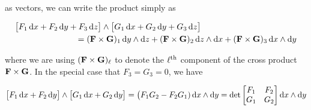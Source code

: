 \begin{eg}
as vectors, we can write the product simply as 
\begin{impeqn}\label{eqn:prodCross}
\begin{align*}
&\big[F_1\,\mathrm{d}x
     + F_2\,\mathrm{d}y
     + F_3\,\mathrm{d}z\big]
   \wedge
   \big[G_1\,\mathrm{d}x
     + G_2\,\mathrm{d}y
     + G_3\,\mathrm{d}z\big]
\\
&\hskip1in=(\mathbf{F}\times\mathbf{G})_1\, \mathrm{d}y\wedge\mathrm{d}z
 +(\mathbf{F}\times\mathbf{G})_2\, \mathrm{d}z\wedge\mathrm{d}x
 +(\mathbf{F}\times\mathbf{G})_3\, \mathrm{d}x\wedge\mathrm{d}y
\end{align*}
\end{impeqn}
\noindent
where we are using $(\mathbf{F}\times\mathbf{G})_\ell$ to denote the $\ell^{\rm th}$
component of the cross product $\mathbf{F}\times\mathbf{G}$.
In the special case that $F_3=G_3=0$, we have
\begin{impeqn}\label{eqnprodDet}
\begin{align*}
\big[F_1\,\mathrm{d}x
     + F_2\,\mathrm{d}y\big]
   \wedge
   \big[G_1\,\mathrm{d}x
     + G_2\,\mathrm{d}y\big]
=\big(F_1G_2-F_2G_1)\,\mathrm{d}x\wedge\mathrm{d}y
=\det\left[\begin{matrix} F_1 & F_2\\ G_1 & G_2\end{matrix}\right]
         \mathrm{d}x\wedge\mathrm{d}y
\end{align*}
\end{impeqn}


\end{eg}
